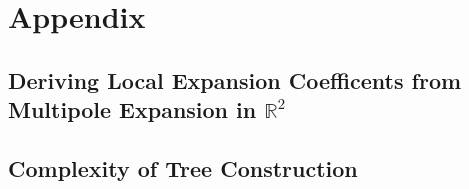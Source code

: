 \chapter{Appendix}

\section{Deriving Local Expansion Coefficents from Multipole Expansion in $\mathbb{R}^2$}\label{app:a_1_fmm_algorithm}


\section{Complexity of Tree Construction}\label{app:a_2_complexity_tree_construction}